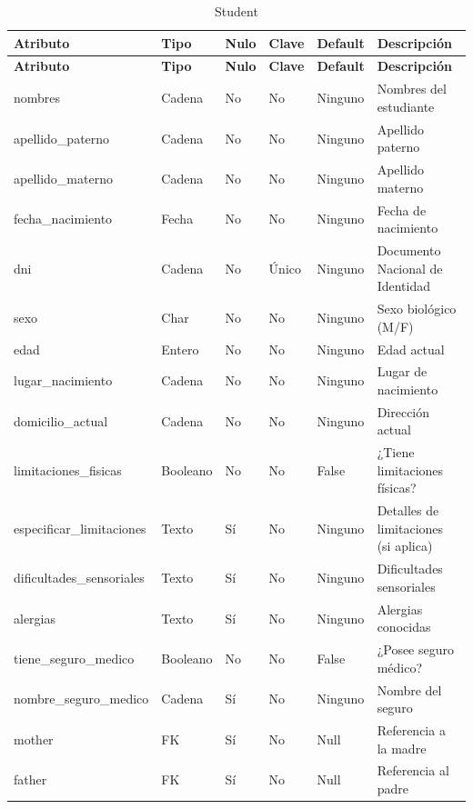 \documentclass{article}
\begin{document}
\begin{longtable}{|l|l|l|l|l|l|}
\caption{Student} \\
\hline
\rowcolor{tabledictionariesbackground}
\textbf{Atributo} & \textbf{Tipo} & \textbf{Nulo} & \textbf{Clave} & \textbf{Default} & \textbf{Descripción} \\
\hline
\endfirsthead

\hline
\rowcolor{tabledictionariesbackground}
\textbf{Atributo} & \textbf{Tipo} & \textbf{Nulo} & \textbf{Clave} & \textbf{Default} & \textbf{Descripción} \\
\hline
\endhead

nombres & Cadena & No & No & Ninguno & Nombres del estudiante \\
apellido\_paterno & Cadena & No & No & Ninguno & Apellido paterno \\
apellido\_materno & Cadena & No & No & Ninguno & Apellido materno \\
fecha\_nacimiento & Fecha & No & No & Ninguno & Fecha de nacimiento \\
dni & Cadena & No & Único & Ninguno & Documento Nacional de Identidad \\
sexo & Char & No & No & Ninguno & Sexo biológico (M/F) \\
edad & Entero & No & No & Ninguno & Edad actual \\
lugar\_nacimiento & Cadena & No & No & Ninguno & Lugar de nacimiento \\
domicilio\_actual & Cadena & No & No & Ninguno & Dirección actual \\
limitaciones\_fisicas & Booleano & No & No & False & ¿Tiene limitaciones físicas? \\
especificar\_limitaciones & Texto & Sí & No & Ninguno & Detalles de limitaciones (si aplica) \\
dificultades\_sensoriales & Texto & Sí & No & Ninguno & Dificultades sensoriales \\
alergias & Texto & Sí & No & Ninguno & Alergias conocidas \\
tiene\_seguro\_medico & Booleano & No & No & False & ¿Posee seguro médico? \\
nombre\_seguro\_medico & Cadena & Sí & No & Ninguno & Nombre del seguro \\
mother & FK & Sí & No & Null & Referencia a la madre \\
father & FK & Sí & No & Null & Referencia al padre \\
\hline
\end{longtable}
\end{document}

